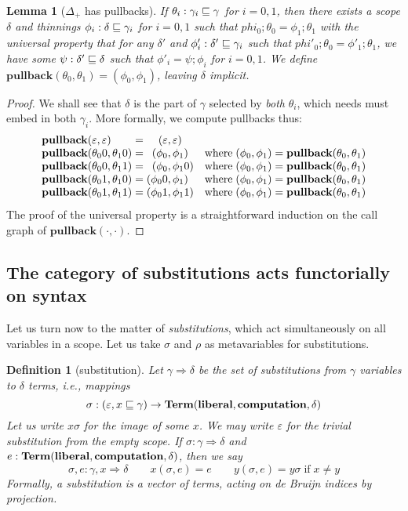 \documentclass{jfp1}
\newtheorem{lemma}[theorem]{Lemma}
\newtheorem{definition}[theorem]{Definition}
\newcommand{\emp}{\varepsilon}
\begin{document}
\newcommand{\pb}[2]{\textbf{pullback}(#1,#2)}
\begin{lemma}[$\Delta_+$ has pullbacks]
  If $\theta_i : \gamma_i\sqsubseteq\gamma$ for $i=0,1$, then there exists a scope $\delta$ and
  thinnings $\phi_i : \delta\sqsubseteq\gamma_i$ for $i=0,1$ such that
  $phi_0;\theta_0 = \phi_1;\theta_1$ with the universal property that
  for any $\delta'$ and $\phi'_i : \delta'\sqsubseteq\gamma_i$ such that
  $phi'_0;\theta_0 = \phi'_1;\theta_1$, we have some $\psi : \delta'\sqsubseteq\delta$ such that
  $\phi'_i = \psi;\phi_i$ for $i=0,1$. We define $\pb{\theta_0}{\theta_1} = (\phi_0,\phi_1)$,
  leaving $\delta$ implicit.
\end{lemma}
\begin{proof}
  We shall see that $\delta$ is the part of $\gamma$ selected by \emph{both} $\theta_i$,
  which needs must embed in both $\gamma_i$. More formally, we compute pullbacks thus:
  \[\begin{array}{l@{\;=\;}r@{,\,}ll}
    \pb{\emp}{\emp} & (\emp&\emp) & \\
    \pb{\theta_00}{\theta_10} & (\phi_0&\phi_1)
      & \mbox{where}\;(\phi_0,\phi_1) = \pb{\theta_0}{\theta_1} \\                                     
    \pb{\theta_00}{\theta_11} & (\phi_0&\phi_10)
      & \mbox{where}\;(\phi_0,\phi_1) = \pb{\theta_0}{\theta_1} \\
    \pb{\theta_01}{\theta_10} & (\phi_00&\phi_1)
      & \mbox{where}\;(\phi_0,\phi_1) = \pb{\theta_0}{\theta_1} \\
    \pb{\theta_01}{\theta_11} & (\phi_01&\phi_11)
      & \mbox{where}\;(\phi_0,\phi_1) = \pb{\theta_0}{\theta_1} \\
    \end{array}\]
  The proof of the universal property is a straightforward induction on the call graph
  of $\pb\cdot\cdot$.
\end{proof}



\subsection{The category of substitutions acts functorially on syntax}

Let us turn now to the matter of \emph{substitutions}, which act simultaneously on all variables
in a scope. Let us take $\sigma$ and $\rho$ as metavariables for substitutions.

\newcommand{\su}{\Rightarrow}
\begin{definition}[substitution]
  Let $\gamma\su\delta$ be the set of substitutions from $\gamma$ variables to $\delta$ terms,
  i.e., mappings \[\sigma : (\emp,x\thin\gamma) \to \Tm{\textbf{liberal}}{\textbf{computation}}\delta\]
  Let us write $x\sigma$ for the image of some $x$. We may write $\emp$ for the trivial
  substitution from the empty scope. If $\sigma : \gamma \su \delta$
  and $e : \mathbf{Term}(\textbf{liberal},\textbf{computation},\delta)$, then we say
  \[\sigma,e : \gamma,x \su \delta\qquad x(\sigma,e) = e\qquad
    y(\sigma,e) = y\sigma\;\mbox{if}\;x\neq y\]
  Formally, a substitution is a vector of terms, acting on de Bruijn indices by
  projection.
\end{definition}
\end{document}
